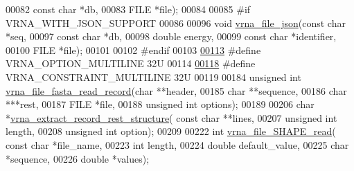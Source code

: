 \begin{DoxyCode}
00082                       \textcolor{keyword}{const} \textcolor{keywordtype}{char} *db,
00083                       FILE *file);
00084 
00085 \textcolor{preprocessor}{#if VRNA\_WITH\_JSON\_SUPPORT}
00086 
00096 \textcolor{keywordtype}{void} \hyperlink{group__file__formats_ga31f4a6c2ea1495a6e4f9eb45a9f6193d}{vrna\_file\_json}(\textcolor{keyword}{const} \textcolor{keywordtype}{char} *seq,
00097                     \textcolor{keyword}{const} \textcolor{keywordtype}{char} *db,
00098                     \textcolor{keywordtype}{double} energy,
00099                     \textcolor{keyword}{const} \textcolor{keywordtype}{char} *identifier,
00100                     FILE *file);
00101 
00102 \textcolor{preprocessor}{#endif}
00103 
\hyperlink{group__file__formats_gabec89c09874528c6cb73140a4c3d86d7}{00113} \textcolor{preprocessor}{#define VRNA\_OPTION\_MULTILINE             32U}
00114 
\hyperlink{group__file__formats_ga7d725ef525b29891abef3f1ed42599a4}{00118} \textcolor{preprocessor}{#define VRNA\_CONSTRAINT\_MULTILINE         32U}
00119 
00184 \textcolor{keywordtype}{unsigned} \textcolor{keywordtype}{int} \hyperlink{group__file__formats_ga8cfb7e271efc9e1f34640acb85475639}{vrna\_file\_fasta\_read\_record}(\textcolor{keywordtype}{char} **header,
00185                                     \textcolor{keywordtype}{char} **sequence,
00186                                     \textcolor{keywordtype}{char}  ***rest,
00187                                     FILE *file,
00188                                     \textcolor{keywordtype}{unsigned} \textcolor{keywordtype}{int} options);
00189 
00206 \textcolor{keywordtype}{char} *\hyperlink{group__file__formats_gad37cbb63a05eed63ba25c91628409be0}{vrna\_extract\_record\_rest\_structure}( \textcolor{keyword}{const} \textcolor{keywordtype}{char} **lines,
00207                                           \textcolor{keywordtype}{unsigned} \textcolor{keywordtype}{int} length,
00208                                           \textcolor{keywordtype}{unsigned} \textcolor{keywordtype}{int} option);
00209 
00222 \textcolor{keywordtype}{int} \hyperlink{group__file__formats_ga646ebf45450a69a7f2533f9ecd283a32}{vrna\_file\_SHAPE\_read}( \textcolor{keyword}{const} \textcolor{keywordtype}{char} *file\_name,
00223                           \textcolor{keywordtype}{int} length,
00224                           \textcolor{keywordtype}{double} default\_value,
00225                           \textcolor{keywordtype}{char} *sequence,
00226                           \textcolor{keywordtype}{double} *values);

\end{DoxyCode}
